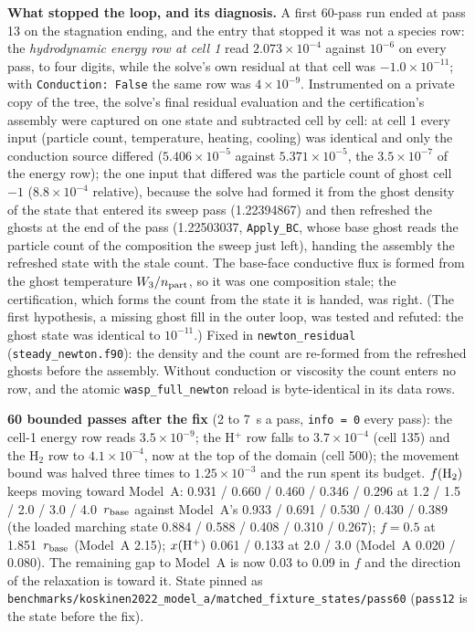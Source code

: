 \documentclass[english,a4paper]{my_memo}
\begin{document}
\textbf{What stopped the loop, and its diagnosis.} A first 60-pass run ended
at pass 13 on the stagnation ending, and the entry that stopped it was not a
species row: the \emph{hydrodynamic energy row at cell 1} read
$2.073\times10^{-4}$ against $10^{-6}$ on every pass, to four digits, while
the solve's own residual at that cell was $-1.0\times10^{-11}$; with
\texttt{Conduction: False} the same row was $4\times10^{-9}$. Instrumented
on a private copy of the tree, the solve's final residual evaluation and the
certification's assembly were captured on one state and subtracted cell by
cell: at cell 1 every input (particle count, temperature, heating, cooling)
was identical and only the conduction source differed ($5.406\times10^{-5}$
against $5.371\times10^{-5}$, the $3.5\times10^{-7}$ of the energy row); the
one input that differed was the particle count of ghost cell $-1$
($8.8\times10^{-4}$ relative), because the solve had formed it from the
ghost density of the state that entered its sweep pass (1.22394867) and
then refreshed the ghosts at the end of the pass (1.22503037,
\texttt{Apply\_BC}, whose base ghost reads the particle count of the
composition the sweep just left), handing the assembly the refreshed state
with the stale count. The base-face conductive flux is formed from the
ghost temperature $W_3/n_{\rm part}$, so it was one composition stale; the
certification, which forms the count from the state it is handed, was
right. (The first hypothesis, a missing ghost fill in the outer loop, was
tested and refuted: the ghost state was identical to $10^{-11}$.) Fixed in
\texttt{newton\_residual} (\texttt{steady\_newton.f90}): the density and the
count are re-formed from the refreshed ghosts before the assembly. Without
conduction or viscosity the count enters no row, and the atomic
\texttt{wasp\_full\_newton} reload is byte-identical in its data rows.

\textbf{60 bounded passes after the fix} (2 to 7~s a pass, \texttt{info = 0}
every pass): the cell-1 energy row reads $3.5\times10^{-9}$; the H$^+$ row
falls to $3.7\times10^{-4}$ (cell 135) and the H$_2$ row to
$4.1\times10^{-4}$, now at the top of the domain (cell 500); the movement
bound was halved three times to $1.25\times10^{-3}$ and the run spent its
budget. $f({\rm H}_2)$ keeps moving toward Model~A: 0.931 / 0.660 / 0.460 /
0.346 / 0.296 at 1.2 / 1.5 / 2.0 / 3.0 / 4.0~$r_{\rm base}$ against Model~A's
0.933 / 0.691 / 0.530 / 0.430 / 0.389 (the loaded marching state 0.884 /
0.588 / 0.408 / 0.310 / 0.267); $f = 0.5$ at 1.851~$r_{\rm base}$ (Model~A
2.15); $x({\rm H}^+)$ 0.061 / 0.133 at 2.0 / 3.0 (Model~A 0.020 / 0.080). The
remaining gap to Model~A is now 0.03 to 0.09 in $f$ and the direction of the
relaxation is toward it. State pinned as
\texttt{benchmarks/koskinen2022\_model\_a/matched\_fixture\_states/pass60}
(\texttt{pass12} is the state before the fix).
\end{document}

